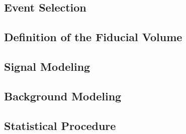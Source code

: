 \documentclass[
12pt, %
english, %
singlespacing, %
liststotoc, %
headsepline, %
]{MastersDoctoralThesis} %
\begin{document}
    \subsection{Event Selection }\label{sec:EventsBackgrounds}
      \label{sec:events_selection}  %
    \subsection{Definition of the Fiducial Volume}\label{sec:FiducialVolume}
      
    \subsection{Signal Modeling}\label{sec:SignalModeling}
     \subsection{Background Modeling}
      \label{sec:background_model}
      \subsection{Statistical Procedure}\label{sec:StatProcedure}      
            
\end{document}
